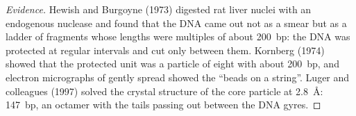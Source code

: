 \begin{proof}[Evidence]
Hewish and Burgoyne (1973) digested rat liver nuclei with an endogenous
nuclease and found that the DNA came out not as a smear but as a ladder
of fragments whose lengths were multiples of about \qty{200}{bp}: the
DNA was protected at regular intervals and cut only between them.
Kornberg (1974) showed that the protected unit was a particle of eight
 with about \qty{200}{bp}, and electron micrographs of gently
spread  showed the ``beads on a string''. Luger and
colleagues (1997) solved the crystal structure of the core particle at
\qty{2.8}{\angstrom}: \qty{147}{bp}, an octamer with the tails passing
out between the DNA gyres.
\end{proof}

